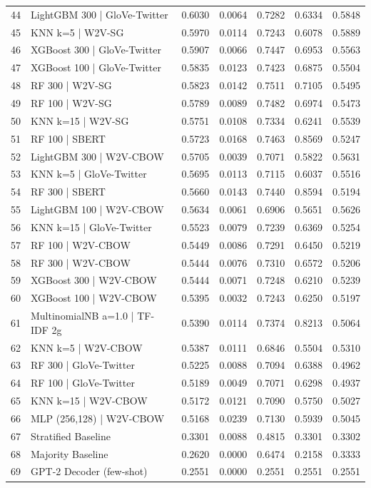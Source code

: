 \begin{table}
\begin{tabular}{llrrrrr}
44 & LightGBM 300 | GloVe-Twitter & 0.6030 & 0.0064 & 0.7282 & 0.6334 & 0.5848 \\
45 & KNN k=5 | W2V-SG & 0.5970 & 0.0114 & 0.7243 & 0.6078 & 0.5889 \\
46 & XGBoost 300 | GloVe-Twitter & 0.5907 & 0.0066 & 0.7447 & 0.6953 & 0.5563 \\
47 & XGBoost 100 | GloVe-Twitter & 0.5835 & 0.0123 & 0.7423 & 0.6875 & 0.5504 \\
48 & RF 300 | W2V-SG & 0.5823 & 0.0142 & 0.7511 & 0.7105 & 0.5495 \\
49 & RF 100 | W2V-SG & 0.5789 & 0.0089 & 0.7482 & 0.6974 & 0.5473 \\
50 & KNN k=15 | W2V-SG & 0.5751 & 0.0108 & 0.7334 & 0.6241 & 0.5539 \\
51 & RF 100 | SBERT & 0.5723 & 0.0168 & 0.7463 & 0.8569 & 0.5247 \\
52 & LightGBM 300 | W2V-CBOW & 0.5705 & 0.0039 & 0.7071 & 0.5822 & 0.5631 \\
53 & KNN k=5 | GloVe-Twitter & 0.5695 & 0.0113 & 0.7115 & 0.6037 & 0.5516 \\
54 & RF 300 | SBERT & 0.5660 & 0.0143 & 0.7440 & 0.8594 & 0.5194 \\
55 & LightGBM 100 | W2V-CBOW & 0.5634 & 0.0061 & 0.6906 & 0.5651 & 0.5626 \\
56 & KNN k=15 | GloVe-Twitter & 0.5523 & 0.0079 & 0.7239 & 0.6369 & 0.5254 \\
57 & RF 100 | W2V-CBOW & 0.5449 & 0.0086 & 0.7291 & 0.6450 & 0.5219 \\
58 & RF 300 | W2V-CBOW & 0.5444 & 0.0076 & 0.7310 & 0.6572 & 0.5206 \\
59 & XGBoost 300 | W2V-CBOW & 0.5444 & 0.0071 & 0.7248 & 0.6210 & 0.5239 \\
60 & XGBoost 100 | W2V-CBOW & 0.5395 & 0.0032 & 0.7243 & 0.6250 & 0.5197 \\
61 & MultinomialNB a=1.0 | TF-IDF 2g & 0.5390 & 0.0114 & 0.7374 & 0.8213 & 0.5064 \\
62 & KNN k=5 | W2V-CBOW & 0.5387 & 0.0111 & 0.6846 & 0.5504 & 0.5310 \\
63 & RF 300 | GloVe-Twitter & 0.5225 & 0.0088 & 0.7094 & 0.6388 & 0.4962 \\
64 & RF 100 | GloVe-Twitter & 0.5189 & 0.0049 & 0.7071 & 0.6298 & 0.4937 \\
65 & KNN k=15 | W2V-CBOW & 0.5172 & 0.0121 & 0.7090 & 0.5750 & 0.5027 \\
66 & MLP (256,128) | W2V-CBOW & 0.5168 & 0.0239 & 0.7130 & 0.5939 & 0.5045 \\
67 & Stratified Baseline & 0.3301 & 0.0088 & 0.4815 & 0.3301 & 0.3302 \\
68 & Majority Baseline & 0.2620 & 0.0000 & 0.6474 & 0.2158 & 0.3333 \\
69 & GPT-2 Decoder (few-shot) & 0.2551 & 0.0000 & 0.2551 & 0.2551 & 0.2551 \\
\bottomrule
\end{tabular}
\end{table}
